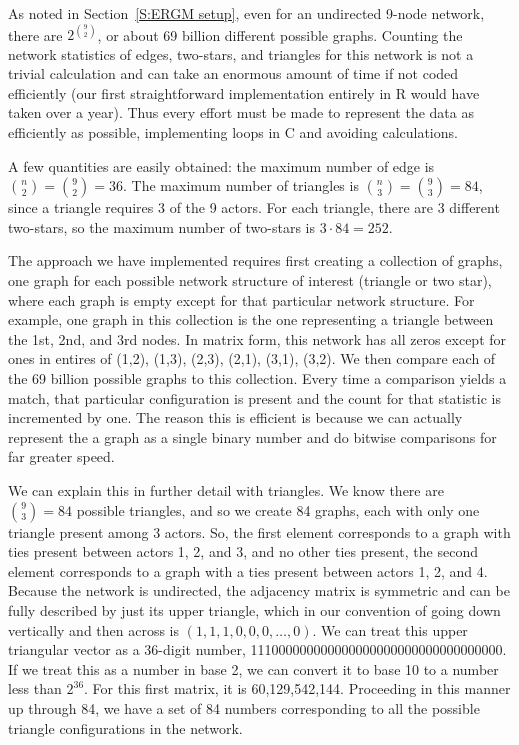 \label{A:Triangle count}
As noted in Section~\ref{S:ERGM setup}, even for an undirected 9-node network, 
there are $2^{{9\choose 2}}$, or about 69 billion different possible graphs.
Counting the network statistics of edges, two-stars, and triangles for this
network is not a trivial calculation and can take an enormous amount of time 
if not coded efficiently (our first straightforward implementation 
entirely in R would have taken over a year).  Thus every effort must 
be made to represent the data as efficiently as possible, 
implementing loops in C and avoiding calculations.

A few quantities are easily obtained: the maximum number of edge is 
${n \choose 2} = {9 \choose 2} = 36$.  The maximum number of triangles is 
${n \choose 3} = {9 \choose 3} = 84$, since a triangle requires 3 of the 9 actors.  
For each triangle, there are 3  different two-stars, so the maximum number 
of two-stars is $3 \cdot 84 = 252$.


The approach we have implemented requires first creating a collection of graphs,
one graph for each possible network structure of interest (triangle or two star),
where each graph is empty except for that particular network structure.  For example,
one graph in this collection is the one representing a triangle between the 1st, 2nd, and 3rd nodes.  In matrix
form, this network has all zeros except for ones in entires of (1,2), (1,3), (2,3), 
(2,1), (3,1), (3,2).
We then compare each of the 69 billion possible graphs to this collection.
Every time a comparison yields a match, that particular configuration is present
and the count for that statistic is incremented by one.  
The reason this is efficient is because we can actually represent the 
a graph as a single binary number and do bitwise comparisons for far greater speed.

We can explain this in further detail with triangles.
We know there are ${9 \choose 3} = 84$ possible triangles, and so we create
84 graphs, each with only one triangle present among 3 actors.  
So, the first element corresponds to a graph with ties present between 
actors 1, 2, and 3, and no other ties present, the second element corresponds 
to a graph with a ties present between actors 1, 2, and 4.  
Because the network is undirected, the adjacency matrix is symmetric and 
can be fully described by just its upper triangle, which in our convention 
of going down vertically and then across is $(1,1,1,0,0,0, \ldots,0)$.  
We can treat this upper triangular vector as a 36-digit number, 
111000000000000000000000000000000000.  If we treat this as a number 
in base 2, we can convert it to base 10 to a number less than $2^{36}$.  
For this first matrix, it is 60,129,542,144.  Proceeding in this manner up 
through 84, we have a set of 84 numbers corresponding to all the possible 
triangle configurations in the network.  

